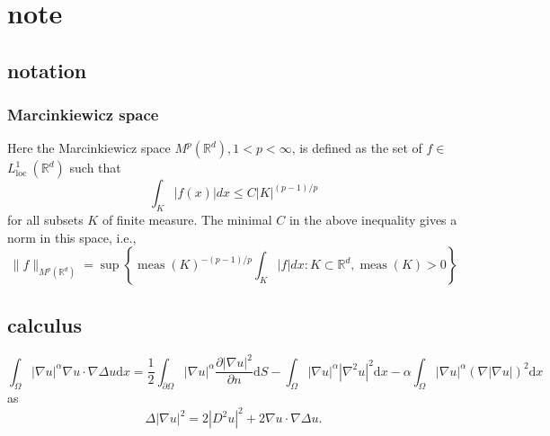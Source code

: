 
\chapter{note}

\section{notation}

\subsection{Marcinkiewicz space}

Here the Marcinkiewicz space $M^p\left(\mathbb{R}^d\right), 1<p<\infty$, is defined as the set of $f \in$ $L_{\text {loc }}^1(\mathbb{R}^d)$ such that
\[
\int_K|f(x)| d x \leq C|K|^{(p-1) / p}
\]
for all subsets $K$ of finite measure. The minimal $C$ in the above inequality gives a norm in this space, i.e.,
\[
\|f\|_{M^p\left(\mathbb{R}^d\right)}=\sup \left\{\operatorname{meas}(K)^{-(p-1) / p} \int_K|f| d x: K \subset \mathbb{R}^d, \operatorname{meas}(K)>0\right\}
\]

\section{calculus}
\begin{equation}
	\int_\Omega |\nabla u|^\alpha \nabla u \cdot \nabla\Delta u\mathrm{d}x = \frac{1}{2}\int_{\partial \Omega} |\nabla u|^\alpha \frac{\partial |\nabla u|^2}{\partial n}\mathrm{d}S - \int_\Omega |\nabla u|^\alpha |\nabla^2u|^2\mathrm{d}x - \alpha \int_\Omega |\nabla u|^\alpha (\nabla |\nabla u|)^2\mathrm{d}x
\end{equation}
as \begin{equation}
	\nonumber
	\Delta|\nabla u|^2 = 2|D^2u|^2 + 2\nabla u \cdot \nabla \Delta u.
\end{equation}

